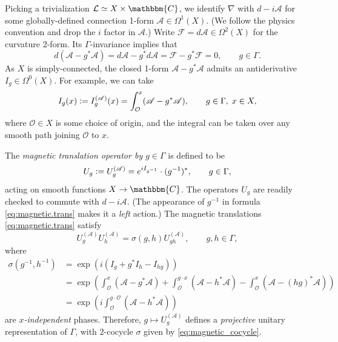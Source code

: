 \documentclass{amsart}
\numberwithin{figure}{section}
\numberwithin{equation}{section}
\numberwithin{table}{section}
\theoremstyle{plain}
\theoremstyle{definition}
\theoremstyle{remark}
\theoremstyle{nonumber}
\newcommand{\C}{\mathbb{C}}
\newcommand{\defeq}{\mathrel{\vcentcolon=}}
\renewcommand{\mathbb}{\mathbbm} %
\begin{document}
Picking a trivialization $\mathcal{L}\simeq X\times\C$, we identify 
$\nabla$ with
$d-i\mathscr{A}$ for some globally-defined connection 1-form
$\mathscr{A}\in\Omega^1(X)$. (We follow the physics convention and drop the
$i$ factor in $\mathscr{A}$.) Write
$\mathscr{F}=d\mathscr{A}\in\Omega^2(X)$ for the curvature 2-form. Its
$\Gamma$-invariance implies that
\[
d(\mathscr{A}-g^*\mathscr{A})=d\mathscr{A}-g^*d\mathscr{A}=\mathscr{F}-g^*\mathscr{F}=0,\qquad g\in \Gamma.
\]
As $X$ is simply-connected, the closed 1-form $\mathscr{A}-g^*\mathscr{A}$ admits an antiderivative $I_g\in\Omega^0(X)$. For example, we can take
\begin{equation}\label{eq:magnetic_antiderivative}
I_g(x)\defeq I_g^{(\mathscr{A})}(x)=\int_\mathcal{O}^x(\mathscr{A}-g^*\mathscr{A}),\qquad g\in \Gamma,\;x\in X,
\end{equation}
where $\mathcal{O}\in X$ is some choice of origin, and the integral can be taken over any smooth path joining $\mathcal{O}$ to $x$. 

The \emph{magnetic translation operator by $g\in \Gamma$} is defined to be
\begin{equation}\label{eq:magnetic.trans}
U_{g}\defeq U_{g}^{(\mathscr{A})}=e^{iI_{g^{-1}}}\cdot (g^{-1})^*,\qquad g\in \Gamma,
\end{equation}
acting on smooth functions $X\to\C$. The operators $U_g$ are readily
checked to commute with $d-i\mathscr{A}$. (The appearance of $g^{-1}$ in
formula \eqref{eq:magnetic.trans} makes it a \emph{left} action.) The
magnetic translations \eqref{eq:magnetic.trans} satisfy
\begin{equation}\label{eq:magnetic.translation.projective}
U^{(\mathscr{A})}_{g}U^{(\mathscr{A})}_{h}=\sigma(g,h)U^{(\mathscr{A})}_{gh},\qquad g, h\in \Gamma,
\end{equation}
where
\begin{equation}\label{eq:magnetic_cocycle}
\begin{aligned}
\sigma(g^{-1},h^{-1})&=\exp\left(i(I_{g}+g^*I_{h}-I_{hg})\right)\\
&=\exp\left(\int_{\mathcal{O}}^x(\mathscr{A}-g^*\mathscr{A})+\int_{\mathcal{O}}^{g\cdot x}(\mathscr{A}-h^*\mathscr{A})-\int_{\mathcal{O}}^x(\mathscr{A}-(hg)^*\mathscr{A})\right)\\
&=\exp\left(i\int_{\mathcal{O}}^{g\cdot\mathcal{O}} (\mathscr{A}-h^*\mathscr{A})\right)
\end{aligned}
\end{equation}
are \emph{$x$-independent} phases. Therefore, $g\mapsto
U_g^{(\mathscr{A})}$ defines a \emph{projective} unitary representation of
$\Gamma$, with $2$-cocycle $\sigma$ given by
\eqref{eq:magnetic_cocycle}.
\end{document}
